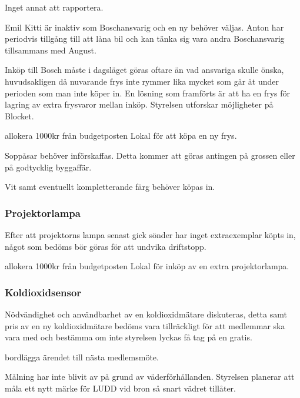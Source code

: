 \documentclass{protokoll}
\begin{document}
Inget annat att rapportera.

Emil Kitti är inaktiv som Boschansvarig och en ny behöver väljas. Anton har periodvis tillgång till att låna bil och kan tänka sig vara andra Boschansvarig tillsammans med August. 


Inköp till Bosch måste i dagsläget göras oftare än vad ansvariga skulle önska, huvudsakligen då nuvarande frys inte rymmer lika mycket som går åt under perioden som man inte köper in. En lösning som framförts är att ha en frys för lagring av extra frysvaror mellan inköp. Styrelsen utforskar möjligheter på Blocket. 
\begin{beslut}
    \att allokera 1000kr från budgetposten Lokal för att köpa en ny frys.
\end{beslut}

Soppåsar behöver införskaffas. Detta kommer att göras antingen på grossen eller på godtycklig byggaffär.

Vit samt eventuellt kompletterande färg behöver köpas in. 


\subsubsection{Projektorlampa}
Efter att projektorns lampa senast gick sönder har inget extraexemplar köpts in, något som bedöms bör göras för att undvika driftstopp. 
\begin{beslut}
    \att allokera 1000kr från budgetposten Lokal för inköp av en extra projektorlampa.
\end{beslut}

\subsubsection{Koldioxidsensor}
Nödvändighet och användbarhet av en koldioxidmätare diskuteras, detta samt pris av en ny koldioxidmätare bedöms vara tillräckligt för att medlemmar ska vara med och bestämma om inte styrelsen lyckas få tag på en gratis. 
\begin{beslut}
    \att bordlägga ärendet till nästa medlemsmöte.
\end{beslut}

Målning har inte blivit av på grund av väderförhållanden. Styrelsen planerar att måla ett nytt märke för LUDD vid bron så snart vädret tillåter.
\end{document}
